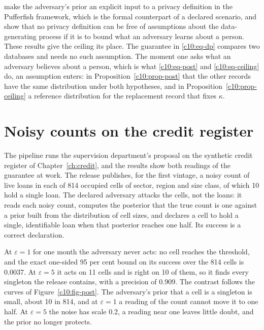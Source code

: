 \citet{kifer2014} make the adversary's prior an explicit input to a privacy
definition in the Pufferfish framework, which is the formal counterpart of a
declared scenario, and \citet{kifer2011} show that no privacy definition can be
free of assumptions about the data-generating process if it is to bound what an
adversary learns about a person. These results give the ceiling its place. The
guarantee in \eqref{c10:eq-dp} compares two databases and needs no such
assumption. The moment one asks what an adversary believes about a person, which
is what \eqref{c10:eq-post} and \eqref{c10:eq-ceiling} do, an assumption enters:
in Proposition~\ref{c10:prop-post} that the other records have the same
distribution under both hypotheses, and in Proposition~\ref{c10:prop-ceiling} a
reference distribution for the replacement record that fixes $\kappa$.

\section{Noisy counts on the credit register}\label{c10:sec-counts}

The pipeline runs the supervision department's proposal on the synthetic credit
register of Chapter~\ref{ch:credit}, and the results show both readings of the
guarantee at work. The release publishes, for the first vintage, a noisy count of
live loans in each of 814 occupied cells of sector, region and size class, of which
10 hold a single loan.
The declared adversary attacks the cells, not the loans: it reads each noisy
count, computes the posterior that the true count is one against a prior built
from the distribution of cell sizes, and declares a cell to hold a single,
identifiable loan when that posterior reaches one half. Its success is a correct
declaration.

At $\varepsilon = 1$ for one month the adversary never acts: no cell reaches the
threshold, and the exact one-sided 95 per cent bound on its success over the 814
cells is 0.0037. At $\varepsilon = 5$ it acts on 11 cells and is right on 10 of
them, so it finds every singleton the release contains, with a precision of 0.909.
The contrast follows the curves of Figure~\ref{c10:fig-post}. The adversary's
prior that a cell is a singleton is small, about 10 in 814, and at
$\varepsilon = 1$ a reading of the count cannot move it to one half. At
$\varepsilon = 5$ the noise has scale 0.2, a reading near one leaves little doubt,
and the prior no longer protects.

